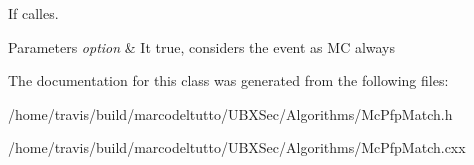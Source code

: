 If calles. 


\begin{DoxyParams}{Parameters}
{\em option} & It true, considers the event as M\-C always \\
\hline
\end{DoxyParams}


The documentation for this class was generated from the following files\-:\begin{DoxyCompactItemize}
\item 
/home/travis/build/marcodeltutto/\-U\-B\-X\-Sec/\-Algorithms/Mc\-Pfp\-Match.\-h\item 
/home/travis/build/marcodeltutto/\-U\-B\-X\-Sec/\-Algorithms/Mc\-Pfp\-Match.\-cxx\end{DoxyCompactItemize}
